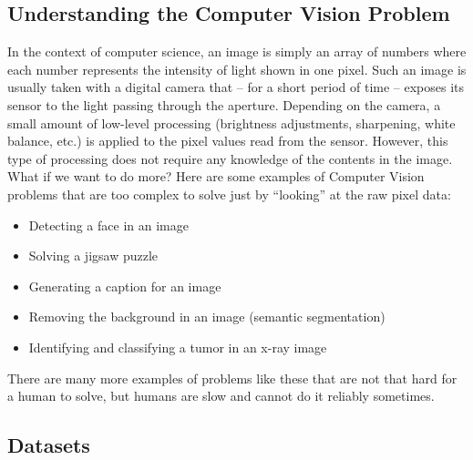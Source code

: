 \documentclass[a4paper]{article}
\begin{document}
	\subsection{Understanding the Computer Vision Problem}
		In the context of computer science, an image is simply an array of numbers where each number represents the intensity of light shown in one pixel.
		Such an image is usually taken with a digital camera that -- for a short period of time -- exposes its sensor to the light passing through the aperture.
		Depending on the camera, a small amount of low-level processing (brightness adjustments, sharpening, white balance, etc.\@) is applied to the pixel values read from the sensor.
		However, this type of processing does not require any knowledge of the contents in the image.
		What if we want to do more? 
		Here are some examples of Computer Vision problems that are too complex to solve just by ``looking'' at the raw pixel data:
		\begin{itemize}
			\item Detecting a face in an image 
			\item Solving a jigsaw puzzle
			\item Generating a caption for an image
			\item Removing the background in an image (semantic segmentation)
			\item Identifying and classifying a tumor in an x-ray image
		\end{itemize}
		There are many more examples of problems like these that are not that hard for a human to solve, but humans are slow and cannot do it reliably sometimes.
		
	\subsection{Datasets}
		
\end{document}
